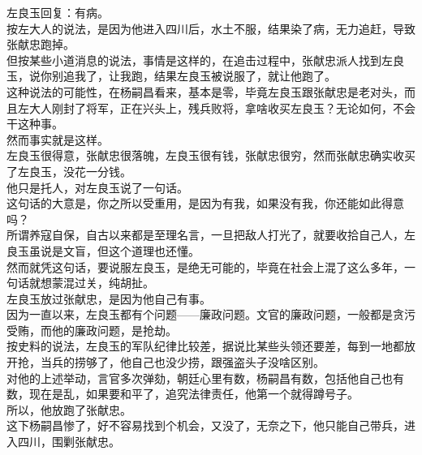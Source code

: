 \begin{multicols}{\theparacolNo}
左良玉回复：有病。\\

按左大人的说法，是因为他进入四川后，水土不服，结果染了病，无力追赶，导致张献忠跑掉。\\

但按某些小道消息的说法，事情是这样的，在追击过程中，张献忠派人找到左良玉，说你别追我了，让我跑，结果左良玉被说服了，就让他跑了。\\

这种说法的可能性，在杨嗣昌看来，基本是零，毕竟左良玉跟张献忠是老对头，而且左大人刚封了将军，正在兴头上，残兵败将，拿啥收买左良玉？无论如何，不会干这种事。\\

然而事实就是这样。\\

左良玉很得意，张献忠很落魄，左良玉很有钱，张献忠很穷，然而张献忠确实收买了左良玉，没花一分钱。\\

他只是托人，对左良玉说了一句话。\\

这句话的大意是，你之所以受重用，是因为有我，如果没有我，你还能如此得意吗？\\

所谓养寇自保，自古以来都是至理名言，一旦把敌人打光了，就要收拾自己人，左良玉虽说是文盲，但这个道理也还懂。\\

然而就凭这句话，要说服左良玉，是绝无可能的，毕竟在社会上混了这么多年，一句话就想蒙混过关，纯胡扯。\\

左良玉放过张献忠，是因为他自己有事。\\

因为一直以来，左良玉都有个问题——廉政问题。文官的廉政问题，一般都是贪污受贿，而他的廉政问题，是抢劫。\\

按史料的说法，左良玉的军队纪律比较差，据说比某些头领还要差，每到一地都放开抢，当兵的捞够了，他自己也没少捞，跟强盗头子没啥区别。\\

对他的上述举动，言官多次弹劾，朝廷心里有数，杨嗣昌有数，包括他自己也有数，现在是乱，如果要和平了，追究法律责任，他第一个就得蹲号子。\\

所以，他放跑了张献忠。\\

这下杨嗣昌惨了，好不容易找到个机会，又没了，无奈之下，他只能自己带兵，进入四川，围剿张献忠。\\


\end{multicols}
